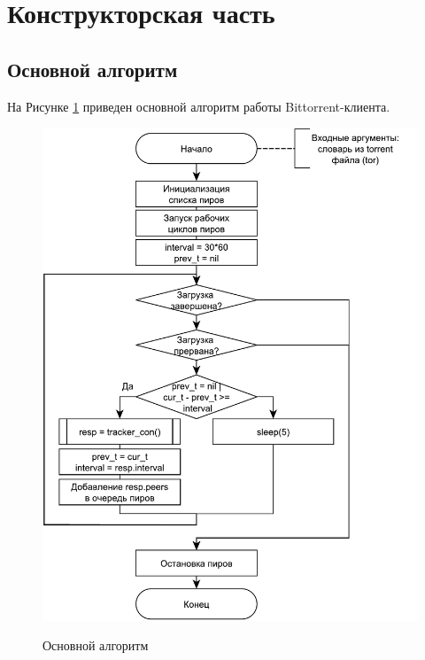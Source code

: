 \section{Конструкторская часть}

\subsection{Основной алгоритм}

На Рисунке \ref{fig200:image} приведен основной алгоритм работы Bittorrent-клиента.
\begin{figure}[h]
	\begin{center}
		{\includegraphics[scale = 0.75]{img/main.pdf}}
		\caption{Основной алгоритм}
		\label{fig200:image}
	\end{center}
\end{figure}

\newpage


